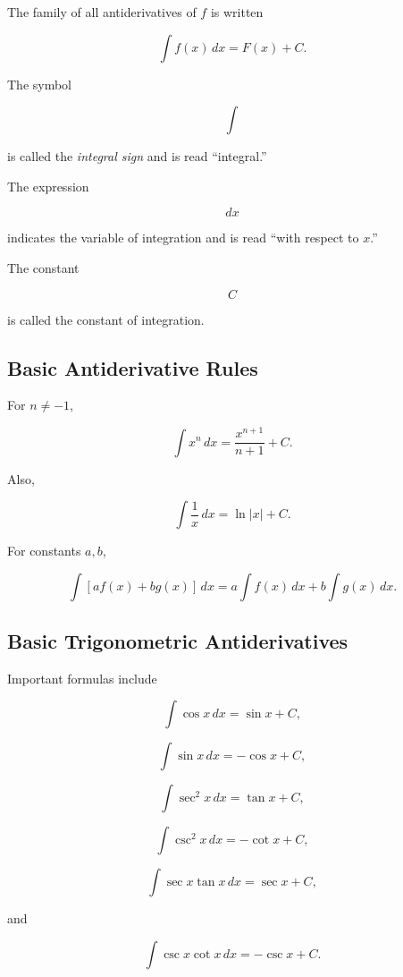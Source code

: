 The family of all antiderivatives of \(f\) is written

\[ \int f(x)\,dx=F(x)+C. \]

The symbol

\[ \int \]

is called the \emph{integral sign} and is read ``integral.''

The expression

\[ dx \]

indicates the variable of integration and is read ``with respect to \(x\).''

The constant

\[ C \]

is called the constant of integration.

\subsection{Basic Antiderivative Rules}
\label{subsec:basic-antiderivative-rules}

For \(n\neq-1\),

\[ \int x^n\,dx=\frac{x^{n+1}}{n+1}+C. \]

Also,

\[ \int \frac1x\,dx=\ln|x|+C. \]

For constants \(a,b\),

\[ \int [af(x)+bg(x)]\,dx
=a\int f(x)\,dx+b\int g(x)\,dx. \]

\subsection{Basic Trigonometric Antiderivatives}
\label{subsec:trig-antiderivatives}

Important formulas include

\[ \int\cos x\,dx=\sin x+C, \]

\[ \int\sin x\,dx=-\cos x+C, \]

\[ \int\sec^2x\,dx=\tan x+C, \]

\[ \int\csc^2x\,dx=-\cot x+C, \]

\[ \int\sec x\tan x\,dx=\sec x+C, \]

and

\[ \int\csc x\cot x\,dx=-\csc x+C. \]

